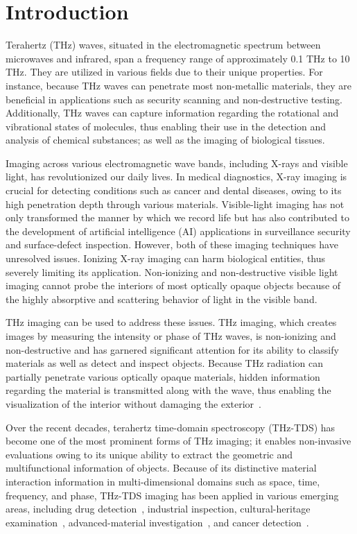 \section{Introduction}
Terahertz (THz) waves, situated in the electromagnetic spectrum between microwaves and infrared, span a frequency range of approximately 0.1 THz to 10 THz. They are utilized in various fields due to their unique properties. For instance, because THz waves can penetrate most non-metallic materials, they are beneficial in applications such as security scanning and non-destructive testing. Additionally, THz waves can capture information regarding the rotational and vibrational states of molecules, thus enabling their use in the detection and analysis of chemical substances; as well as the imaging of biological tissues.

Imaging across various electromagnetic wave bands, including X-rays and visible light, has revolutionized our daily lives. In medical diagnostics, X-ray imaging is crucial  for detecting conditions such as cancer and dental diseases, owing to its high penetration depth through various materials. Visible-light imaging has not only transformed the manner by which we record life but has also contributed to the development of artificial intelligence (AI) applications in surveillance security and surface-defect inspection. However, both of these imaging techniques have unresolved issues. Ionizing X-ray imaging can harm biological entities, thus severely limiting its application. Non-ionizing and non-destructive visible light imaging cannot probe the interiors of most optically opaque objects because of the highly absorptive and scattering behavior of light in the visible band.

THz imaging can be used to address these issues. THz imaging, which creates images by measuring the intensity or phase of THz waves, is non-ionizing and non-destructive and has garnered significant attention for its ability to classify materials as well as detect and inspect objects. Because THz radiation can partially penetrate various optically opaque materials, hidden information regarding the material is transmitted along with the wave, thus enabling the visualization of the interior without damaging the exterior~\cite{thz_imaging1,thz_imaging2,thz_imaging3,thz_imaging4}.

Over the recent decades, terahertz time-domain spectroscopy (THz-TDS) has become one of the most prominent forms of THz imaging; it enables non-invasive evaluations owing to its unique ability to extract the geometric and multifunctional information of objects. Because of its distinctive material interaction information in multi-dimensional domains such as space, time, frequency, and phase, THz-TDS imaging has been applied in various emerging areas, including drug detection~\cite{kawase2003nondest}, industrial inspection, cultural-heritage examination~\cite{fukunaga2016thz}, advanced-material investigation~\cite{spies2020terahertz}, and cancer detection~\cite{bowman2018pulsed}.

